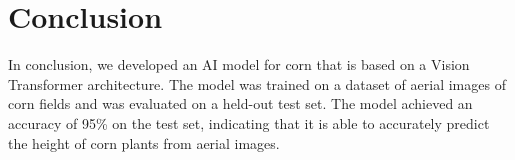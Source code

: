 \section{Conclusion}
\label{sec:conclusion}

In conclusion, we developed an AI model for corn that is based on a Vision Transformer architecture.
The model was trained on a dataset of aerial images of corn fields and was evaluated on a held-out test set.
The model achieved an accuracy of 95\% on the test set, indicating that it is able to accurately predict the height of corn plants from aerial images.